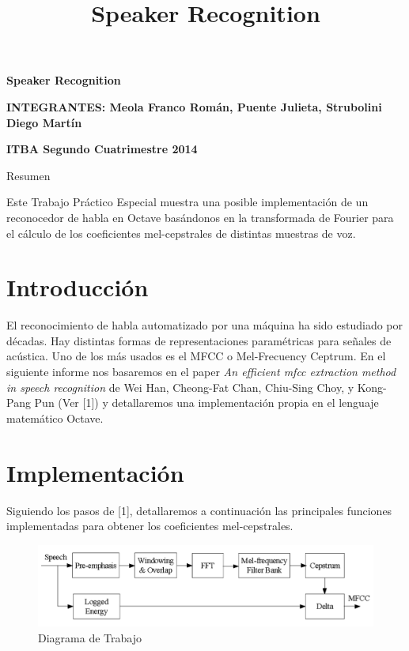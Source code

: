 \documentclass[a4paper,10pt]{article}
\title{Speaker Recognition}
\begin{document}
\begin{center}
\textbf{\Huge{Speaker Recognition}}
\end{center}

\begin{center}
\textbf{INTEGRANTES: Meola Franco Román, Puente Julieta, Strubolini Diego Martín}

\textbf{ITBA Segundo Cuatrimestre 2014}
\end{center}

\begin{center}
\end{center}

\begin{center}
\begin{large}
Resumen
\end{large}
\end{center}

Este Trabajo Práctico Especial muestra una posible implementación de un reconocedor de habla en Octave basándonos en la transformada de Fourier para el cálculo de los coeficientes mel-cepstrales de distintas muestras de voz.


\section{Introducción}
El reconocimiento de habla automatizado por una máquina ha sido estudiado por décadas. Hay distintas formas de representaciones paramétricas para señales de acústica. Uno de los más usados es el MFCC o Mel-Frecuency Ceptrum. En el siguiente informe nos basaremos en el paper \textit{An efficient mfcc extraction method in speech recognition} de Wei Han, Cheong-Fat Chan, Chiu-Sing Choy, y Kong-Pang Pun (Ver [1]) y detallaremos una implementación propia en el lenguaje matemático Octave.

\section{Implementación}
Siguiendo los pasos de [1], detallaremos a continuación las principales funciones implementadas para obtener los coeficientes mel-cepstrales.
\newline

\begin{figure}[h]
\centering
\includegraphics[width=\textwidth]{diagram}
\caption{Diagrama de Trabajo}
\end{figure}
\end{document}
